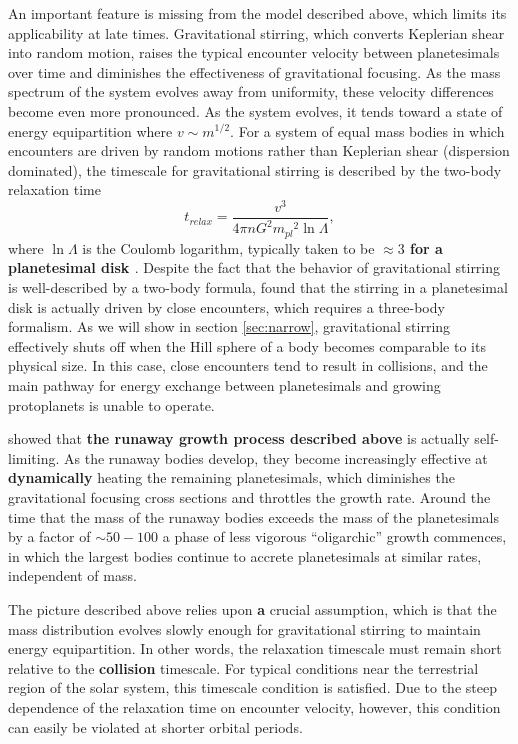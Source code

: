 \documentclass[twocolumn,linenumbers]{aastex63}
\begin{document}
An important feature is missing from the model described above, which
limits its applicability at late times. Gravitational stirring, which converts
Keplerian shear into random motion, raises the typical encounter velocity
between planetesimals over time \citep{weidenschilling89, ida90} and diminishes the effectiveness of gravitational
focusing. As the mass spectrum of the system evolves away from uniformity, these velocity differences become even more
pronounced. As the system evolves, it tends toward a state of
energy equipartition where $v \sim m^{1/2}$. For a system of equal mass bodies in which encounters are driven by random 
motions rather than Keplerian shear (dispersion dominated), the timescale for gravitational stirring is described by the two-body 
relaxation time \citep{ida93}
\begin{equation}\label{eq:relax}
	t_{relax} = \frac{v^3}{4 \pi n G^2 {m_{pl}}^2 \ln \Lambda},
\end{equation}
where $\ln \Lambda$ is the Coulomb logarithm,
typically taken to be \textbf{$\approx 3$ for a planetesimal disk \citep{ida90, stewart00}}. Despite
the fact that the behavior of gravitational stirring is well-described
by a two-body formula, \citep{ida93} found that the stirring in a planetesimal disk is actually driven by close encounters, which 
requires a three-body formalism. As we will show in section \ref{sec:narrow}, gravitational stirring effectively shuts off when the 
Hill sphere of a body becomes comparable to its physical size. In this case, close encounters tend to result in collisions, and the 
main pathway for energy exchange between planetesimals and growing protoplanets is unable to operate.

\citet{kokubo98} showed that \textbf{the runaway growth process described above} is actually self-limiting. As the runaway
bodies develop, they become increasingly effective at \textbf{dynamically} heating the
remaining planetesimals, which diminishes the
gravitational focusing cross sections and throttles the growth rate. Around the time
that the mass of the runaway bodies exceeds the mass of the planetesimals
by a factor of $\sim 50-100$
\citep{ida93} a phase of less vigorous ``oligarchic'' 
growth commences, in which the largest bodies continue to 
accrete planetesimals at similar rates, independent of mass.

The picture described above relies upon \textbf{a} crucial assumption, which
is that the mass distribution evolves slowly enough for gravitational stirring to maintain energy equipartition. In other words, the relaxation timescale must remain short relative to the \textbf{collision} timescale. For typical conditions near the terrestrial region of the solar system, this timescale condition is satisfied. Due to the steep dependence of the relaxation time on encounter velocity, however, this condition can easily be violated at shorter orbital periods.
\end{document}
